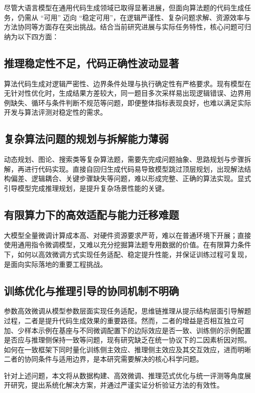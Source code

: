 
尽管大语言模型在通用代码生成领域已取得显著进展，但面向算法题的代码生成任务，仍需从 “可用” 迈向 “稳定可用”，在逻辑严谨性、复杂问题求解、资源效率与方法协同等方面存在突出挑战。结合当前研究进展与实际任务特性，核心问题可归纳为以下四方面：

\subsection{推理稳定性不足，代码正确性波动显著}
算法代码生成对逻辑严密性、边界条件处理与执行确定性有严格要求。现有模型在无针对性优化时，生成结果方差较大，同一题目多次采样易出现逻辑错误、边界用例缺失、循环与条件判断不规范等问题，即便整体指标表现良好，也难以满足实际开发与算法评测对稳定性的需求。

\subsection{复杂算法问题的规划与拆解能力薄弱}
动态规划、图论、搜索类等复杂算法题，需要先完成问题抽象、思路规划与步骤拆解，再进行代码实现。直接自回归生成代码易导致模型跳过顶层规划，出现解法结构偏差、逻辑耦合、关键步骤缺失等问题，难以形成完整、正确的算法实现。显式引导模型完成推理规划，是提升复杂场景性能的关键。

\subsection{有限算力下的高效适配与能力迁移难题}
大模型全量微调计算成本高、对硬件资源要求严苛，难以在普通环境下开展；直接使用通用指令微调模型，又难以充分挖掘算法题专用数据的价值。在有限算力条件下，如何以高效微调方式实现任务适配、稳定提升性能，并保证训练过程可复现，是面向实际落地的重要工程挑战。

\subsection{训练优化与推理引导的协同机制不明确}
参数高效微调从模型参数层面实现任务适配，思维链推理从提示结构层面引导解题过程，二者是提升代码生成效果的重要路径。然而，二者的增益是否相互独立可加、少样本示例在基座与不同微调配置下的边际效应是否一致、训练侧的示例配置是否应与推理侧保持一致等问题，现有研究缺乏在统一协议下的二因素析因对照。如何在一致框架下同时量化训练侧主效应、推理侧主效应及其交互效应，进而明晰二者的协同条件与适用边界，是本研究需要解决的核心科学问题。

针对上述问题，本文将从数据构建、高效微调、推理范式优化与统一评测等角度展开研究，提出系统化解决方案，并通过严谨实证分析验证方法的有效性。